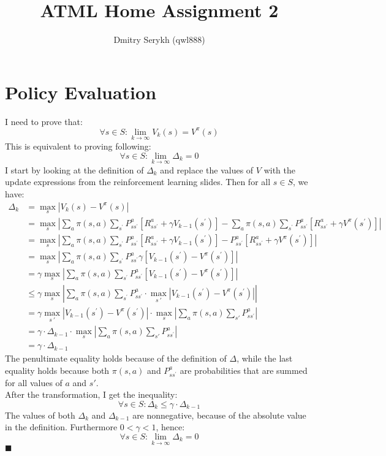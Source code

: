 \documentclass[a4paper]{article}
\title{\vspace{-5cm}ATML Home Assignment 2}
\author{Dmitry Serykh (qwl888)}
\newcommand*{\QEDA}{\hfill\ensuremath{\blacksquare}}%
\begin{document}
\maketitle
\section{Policy Evaluation}
\label{sec:1}
I need to prove that:
\[
\forall s \in S : \lim _{k \rightarrow \infty} V_{k}(s)=V^{\pi}(s)
\]
This is equivalent to proving following:
\[
\forall s \in S : \lim _{k \rightarrow \infty} \Delta_{k} = 0
\]
I start by looking at the definition of $\Delta_k$ and replace the values of
$V$ with the update expressions from the reinforcement learning slides. Then for
all $s \in S$, we have:
\begin{align*}
  \Delta_{k} &= \max _{s}\left|V_{k}(s)-V^{\pi}(s)\right|\\
  &= \max _{s}\left|
  \sum_{a} \pi(s, a) \sum_{s^{\prime}} P_{s s^{\prime}}^{a}\left[R_{s s^{\prime}}^{a}+\gamma
    V_{k-1}\left(s^{\prime}\right)\right] -
  \sum_{a} \pi(s, a) \sum_{s^{\prime}} P_{s s^{\prime}}^{a}\left[R_{s s^{\prime}}^{a}+\gamma
    V^{\pi}\left(s^{\prime}\right)\right] \right| \\
  &= \max _{s}\left| \sum_{a} \pi(s, a)
  \sum_{s^{\prime}} P_{s s^{\prime}}^{a}\left[R_{s s^{\prime}}^{a}+\gamma
    V_{k-1}\left(s^{\prime}\right)\right] - P_{s s^{\prime}}^{a}\left[R_{s s^{\prime}}^{a}+\gamma
    V^{\pi}\left(s^{\prime}\right)\right]\right| \\
  &= \max _{s}\left| \sum_{a} \pi(s, a)\sum_{s^{\prime}} P_{s s^{\prime}}^{a} \gamma
  \left[V_{k-1}\left(s^{\prime}\right) - V^{\pi}\left(s^{\prime}\right)\right]
  \right| \\
  &= \gamma \max _{s}\left| \sum_{a} \pi(s, a)\sum_{s^{\prime}} P_{s s^{\prime}}^{a}
  \left[V_{k-1}\left(s^{\prime}\right) - V^{\pi}\left(s^{\prime}\right)\right]
  \right| \\
  & \leq \gamma  \max _{s}\left| \sum_{a} \pi(s, a)\sum_{s^{\prime}} P_{s s^{\prime}}^{a}
  \cdot \max _{s~{\prime}} \left|
  V_{k-1}\left(s^{\prime}\right) - V^{\pi}\left(s^{\prime}\right) \right|
  \right| \\
  & = \gamma \max _{s~{\prime}} \left|
  V_{k-1}\left(s^{\prime}\right) - V^{\pi}\left(s^{\prime}\right) \right| \cdot
  \max _{s}\left| \sum_{a} \pi(s, a)\sum_{s'} P_{s s^{\prime}}^{a}
  \right| \\
  &= \gamma \cdot \Delta_{k-1} \cdot
  \max _{s}\left| \sum_{a} \pi(s, a)\sum_{s'} P_{s s^{\prime}}^{a}
  \right| \\
  &= \gamma \cdot \Delta_{k-1} 
\end{align*}
The penultimate equality holds because of the definition of $\Delta$, while
the last equality holds because both $\pi(s,a)$ and
$P_{s s^{\prime}}^{a}$ are probabilities that are summed for all values of
$a$ and $s'$. \\
After the transformation, I get the inequality:
\[
\forall s \in S : \Delta_k  \leq \gamma \cdot \Delta_{k-1}
\]
The values of both $\Delta_k$ and $\Delta_{k-1}$ are nonnegative, because
of the absolute value in the definition. Furthermore $0 < \gamma < 1$, hence:
\[
\forall s \in S : \lim _{k \rightarrow \infty} \Delta_{k} = 0
\]
\QEDA
\end{document}
